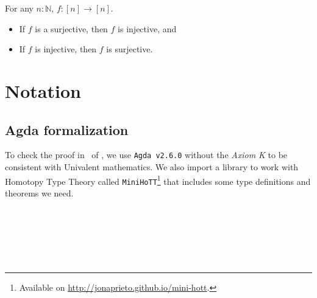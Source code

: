 \documentclass[11pt, a4paper, oneside]{amsart}
\begin{document}
For any $n : ℕ$, $f : [n] \to [n]$.
\begin{itemize}
\item If $f$ is a surjective, then $f$ is injective, and
\item If $f$ is injective, then $f$ is surjective.
\end{itemize}

\section{Notation}

\subsection{Agda formalization}

To check the proof in~ of
, we use \texttt{Agda v2.6.0} without the
\emph{Axiom K} to be consistent with Univalent mathematics. We also
import a library to work with Homotopy Type Theory called
\texttt{MiniHoTT}\footnote{Available on
\url{http://jonaprieto.github.io/mini-hott}.} that includes some type
definitions and theorems we need.

\begin{code}%
\>[0]\AgdaSymbol{\{-\#}\AgdaSpace{}%
\AgdaSpace{}%
%
\>[25]\AgdaSymbol{\#-\}}\<%
\\
\>[0]\AgdaSpace{}%
\AgdaSpace{}%
\<%
\end{code}

\begin{code}[hide]%
\>[0]\AgdaSpace{}%
\AgdaModule{\AgdaUnderscore{}}\AgdaSpace{}%
\AgdaSymbol{\{}\AgdaSpace{}%
\AgdaSymbol{:}\AgdaSpace{}%
\AgdaSymbol{\}}\AgdaSpace{}%
\<%
\\
\>[0][@{}l@{\AgdaIndent{0}}]%
\>[2]\AgdaSpace{}%
\AgdaSpace{}%
\<%
\\
%
\>[2]\AgdaSpace{}%
\AgdaSpace{}%
\<%
\\
%
\>[2]\AgdaSpace{}%
\AgdaSymbol{=}\AgdaSpace{}%
\AgdaSpace{}%
\AgdaSymbol{\{}\AgdaSymbol{\}}\<%
\end{code}
\end{document}
